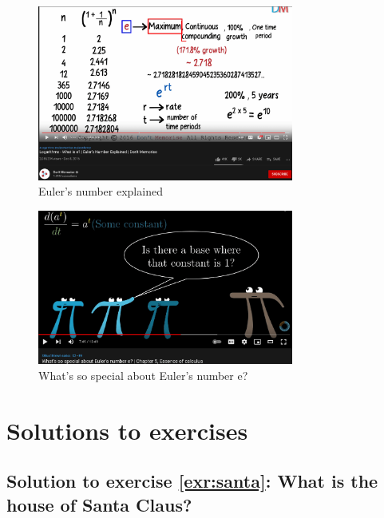 \documentclass[
  12pt,
  oneside]{book}
\theoremstyle{definition}
\theoremstyle{definition}
\theoremstyle{definition}
\theoremstyle{definition}
\theoremstyle{remark}
\begin{document}
\begin{figure}
\centering
\includegraphics[width=0.75\textwidth,height=\textheight]{fig/whatse.png}
\caption{\label{fig:whatse} Euler's number explained}
\end{figure}

\begin{figure}
\centering
\includegraphics[width=0.75\textwidth,height=\textheight]{fig/euler.png}
\caption{\label{fig:euler} What's so special about Euler's number e?}
\end{figure}

\hypertarget{solutions-to-exercises}{%
\section{Solutions to exercises}\label{solutions-to-exercises}}

\hypertarget{sol:santa}{%
\subsection*{Solution to exercise \ref{exr:santa}: What is the house of Santa Claus?}\label{sol:santa}}
\end{document}
